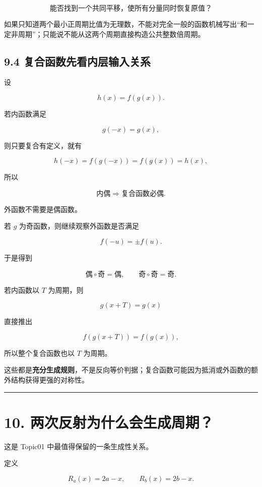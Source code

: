 \documentclass[11pt,a4paper]{ctexart}
\begin{document}
\[
\boxed{\text{能否找到一个共同平移，使所有分量同时恢复原值？}}
\]

如果只知道两个最小正周期比值为无理数，不能对完全一般的函数机械写出``和一定非周期''；只能说不能从这两个周期直接构造公共整数倍周期。

\subsection{9.4
复合函数先看内层输入关系}\label{ux590dux5408ux51fdux6570ux5148ux770bux5185ux5c42ux8f93ux5165ux5173ux7cfb}

设

\[
h(x)=f(g(x)).
\]

若内函数满足

\[
g(-x)=g(x),
\]

则只要复合有定义，就有

\[
h(-x)=f(g(-x))=f(g(x))=h(x),
\]

所以

\[
\boxed{\text{内偶}\Rightarrow\text{复合函数必偶}.}
\]

外函数不需要是偶函数。

若 \(g\) 为奇函数，则继续观察外函数是否满足

\[
f(-u)=\pm f(u).
\]

于是得到

\[
\text{偶}\circ\text{奇}=\text{偶},\qquad
\text{奇}\circ\text{奇}=\text{奇}.
\]

若内函数以 \(T\) 为周期，则

\[
g(x+T)=g(x)
\]

直接推出

\[
f(g(x+T))=f(g(x)),
\]

所以整个复合函数也以 \(T\) 为周期。

这些都是\textbf{充分生成规则}，不是反向等价判据；复合函数可能因为抵消或外函数的额外结构获得更强的对称性。

\begin{center}\rule{0.5\linewidth}{0.5pt}\end{center}

\section{10.
两次反射为什么会生成周期？}\label{ux4e24ux6b21ux53cdux5c04ux4e3aux4ec0ux4e48ux4f1aux751fux6210ux5468ux671f}

这是 Topic01 中最值得保留的一条生成性关系。

定义

\[
R_a(x)=2a-x,
\qquad
R_b(x)=2b-x.
\]
\end{document}
